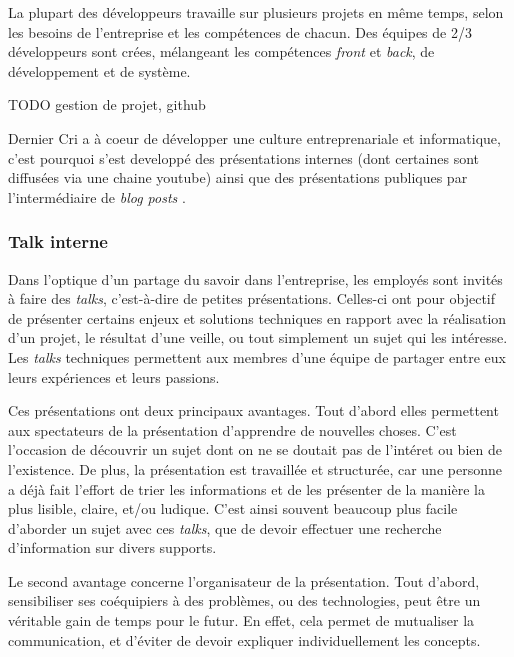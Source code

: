 \documentclass[12pt,a4paper]{article}
\begin{document}
  La plupart des développeurs travaille sur plusieurs projets en même
  temps, selon les besoins de l'entreprise et les compétences de chacun.
  Des équipes de 2/3 développeurs sont crées, mélangeant les compétences
  \emph{front} et \emph{back}, de développement et de système.

  \bigskip

  TODO gestion de projet, github

  \bigskip

  Dernier Cri a à coeur de développer une culture entreprenariale et
  informatique, c'est pourquoi s'est developpé des présentations internes
  (dont certaines sont diffusées via une chaine youtube) ainsi que des
  présentations publiques par l'intermédiaire de \emph{blog posts} .

  \subsubsection{Talk interne}\label{talk-interne}

  \bigskip

  Dans l'optique d'un partage du savoir dans l'entreprise, les employés
  sont invités à faire des \emph{talks}, c'est-à-dire de petites
  présentations. Celles-ci ont pour objectif de présenter certains enjeux
  et solutions techniques en rapport avec la réalisation d'un projet, le
  résultat d'une veille, ou tout simplement un sujet qui les intéresse.
  Les \emph{talks} techniques permettent aux membres d'une équipe de
  partager entre eux leurs expériences et leurs passions.

  \bigskip

  Ces présentations ont deux principaux avantages. Tout d'abord elles
  permettent aux spectateurs de la présentation d'apprendre de nouvelles
  choses. C'est l'occasion de découvrir un sujet dont on ne se doutait pas
  de l'intéret ou bien de l'existence. De plus, la présentation est
  travaillée et structurée, car une personne a déjà fait l'effort de trier
  les informations et de les présenter de la manière la plus lisible,
  claire, et/ou ludique. C'est ainsi souvent beaucoup plus facile
  d'aborder un sujet avec ces \emph{talks}, que de devoir effectuer une
  recherche d'information sur divers supports.

  \bigskip

  Le second avantage concerne l'organisateur de la présentation. Tout
  d'abord, sensibiliser ses coéquipiers à des problèmes, ou des
  technologies, peut être un véritable gain de temps pour le futur. En
  effet, cela permet de mutualiser la communication, et d'éviter de devoir
  expliquer individuellement les concepts.
\end{document}
